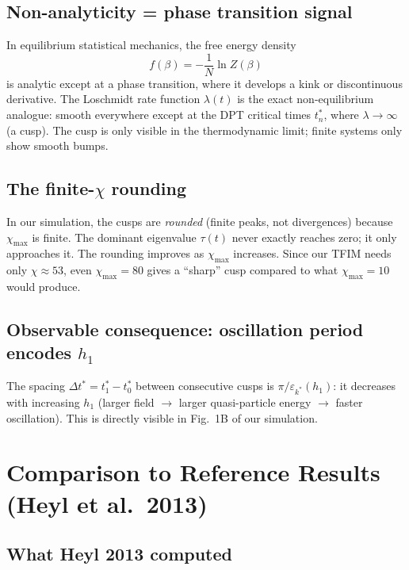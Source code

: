 \documentclass[11pt, a4paper]{article}
\begin{document}
\subsection{Non-analyticity = phase transition signal}

In equilibrium statistical mechanics, the free energy density
\begin{equation}
  f(\beta) = -\frac{1}{N}\ln Z(\beta)
\end{equation}
is analytic except at a phase transition, where it develops a kink or discontinuous derivative. The Loschmidt rate function $\lambda(t)$ is the exact non-equilibrium analogue: smooth everywhere except at the DPT critical times $t^*_n$, where $\lambda \to \infty$ (a cusp). The cusp is only visible in the thermodynamic limit; finite systems only show smooth bumps.

\subsection{The finite-$\chi$ rounding}

In our simulation, the cusps are \emph{rounded} (finite peaks, not divergences) because $\chi_{\max}$ is finite. The dominant eigenvalue $\tau(t)$ never exactly reaches zero; it only approaches it. The rounding improves as $\chi_{\max}$ increases. Since our TFIM needs only $\chi \approx 53$, even $\chi_{\max} = 80$ gives a ``sharp'' cusp compared to what $\chi_{\max} = 10$ would produce.

\subsection{Observable consequence: oscillation period encodes $h_1$}

The spacing $\Delta t^* = t^*_1 - t^*_0$ between consecutive cusps is $\pi / \varepsilon_{k^*}(h_1)$: it decreases with increasing $h_1$ (larger field $\to$ larger quasi-particle energy $\to$ faster oscillation). This is directly visible in Fig.~1B of our simulation.

\section{Comparison to Reference Results (Heyl et al.\ 2013)}
\label{sec:reference}

\subsection{What Heyl 2013 computed}
\end{document}
